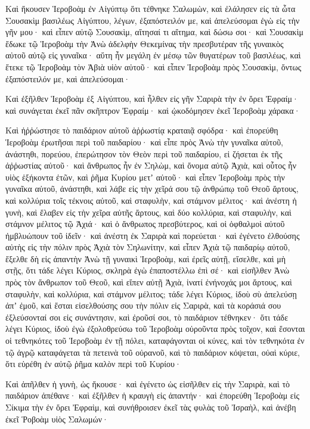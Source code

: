 {\par }{\PP {}Καὶ ἤκουσεν Ἱεροβοὰμ ἐν Αἰγύπτῳ ὅτι τέθνηκε Σαλωμὼν, καὶ ἐλάλησεν εἰς τὰ ὦτα Σουσακὶμ βασιλέως Αἰγύπτου, λέγων, ἐξαπόστειλόν με, καὶ ἀπελεύσομαι ἐγὼ εἰς τὴν γῆν μου· καὶ εἶπεν αὐτῷ Σουσακὶμ, αἴτησαί τι αἴτημα, καὶ δώσω σοι·
καὶ Σουσακὶμ ἔδωκε τῷ Ἱεροβοὰμ τὴν Ἀνὼ ἀδελφὴν Θεκεμίνας τὴν πρεσβυτέραν τῆς γυναικὸς αὐτοῦ αὐτῷ εἰς γυναῖκα· αὕτη ἦν μεγάλη ἐν μέσῳ τῶν θυγατέρων τοῦ βασιλέως, καὶ ἔτεκε τῷ Ἱεροβοὰμ τὸν Ἀβιὰ υἱὸν αὐτοῦ·
καὶ εἶπεν Ἱεροβοὰμ πρὸς Σουσακὶμ, ὄντως ἐξαπόστειλόν με, καὶ ἀπελεύσομαι·
\par }{\PP Καὶ ἐξῆλθεν Ἱεροβοὰμ ἐξ Αἰγύπτου, καὶ ἦλθεν εἰς γῆν Σαριρὰ τὴν ἐν ὄρει Ἐφραίμ· καὶ συνάγεται ἐκεῖ πᾶν σκῆπτρον Ἐφραίμ· καὶ ᾠκοδόμησεν ἐκεῖ Ἱεροβοὰμ χάρακα·
\par }{\PP {}Καὶ ἠῤῥώστησε τὸ παιδάριον αὐτοῦ ἀῤῥωστίᾳ κραταιᾷ σφόδρα· καὶ ἐπορεύθη Ἱεροβοὰμ ἐρωτῆσαι περὶ τοῦ παιδαρίου· καὶ εἶπε πρὸς Ἀνὼ τὴν γυναῖκα αὐτοῦ, ἀνάστηθι, πορεύου, ἐπερώτησον τὸν Θεὸν περὶ τοῦ παιδαρίου, εἰ ζήσεται ἐκ τῆς ἀῤῥωστίας αὐτοῦ·
καὶ ἄνθρωπος ἦν ἐν Σηλὼμ, καὶ ὄνομα αὐτῷ Ἀχιὰ, καὶ οὗτος ἦν υἱὸς ἑξήκοντα ἐτῶν, καὶ ῥῆμα Κυρίου μετʼ αὐτοῦ· καὶ εἶπεν Ἱεροβοὰμ πρὸς τὴν γυναῖκα αὐτοῦ, ἀνάστηθι, καὶ λάβε εἰς τὴν χεῖρά σου τῷ ἀνθρώπῳ τοῦ Θεοῦ ἄρτους, καὶ κολλύρια τοῖς τέκνοις αὐτοῦ, καὶ σταφυλὴν, καὶ στάμνον μέλιτος·
καὶ ἀνέστη ἡ γυνὴ, καὶ ἔλαβεν εἰς τὴν χεῖρα αὐτῆς ἄρτους, καὶ δύο κολλύρια, καὶ σταφυλὴν, καὶ στάμνον μέλιτος τῷ Ἀχιά· καὶ ὁ ἄνθρωπος πρεσβύτερος, καὶ οἱ ὀφθαλμοὶ αὐτοῦ ἠμβλυώπουν τοῦ ἰδεῖν·
καὶ ἀνέστη ἐκ Σαριρὰ καὶ πορεύεται· καὶ ἐγένετο ἐλθούσης αὐτὴς εἰς τὴν πόλιν πρὸς Ἀχιὰ τὸν Σηλωνίτην, καὶ εἶπεν Ἀχιὰ τῷ παιδαρίῳ αὐτοῦ, ἔξελθε δὴ εἰς ἀπαντὴν Ἀνὼ τῇ γυναικὶ Ἱεροβοὰμ, καὶ ἐρεῖς αὐτῇ, εἴσελθε, καὶ μὴ στῇς, ὅτι τάδε λέγει Κύριος, σκληρὰ ἐγὼ ἐπαποστέλλω ἐπὶ σέ·
καὶ εἰσῆλθεν Ἀνὼ πρὸς τὸν ἄνθρωπον τοῦ Θεοῦ, καὶ εἴπεν αὐτῇ Ἀχιὰ, ἱνατί ἐνήνοχάς μοι ἄρτους, καὶ σταφυλὴν, καὶ κολλύρια, καὶ στάμνον μέλιτος; τάδε λέγει Κύριος, ἰδοὺ σὺ ἀπελεύσῃ ἀπʼ ἐμοῦ, καὶ ἔσται εἰσελθούσης σου τὴν πόλιν εἰς Σαριρὰ, καὶ τὰ κοράσιά σου ἐξλεύσονταί σοι εἰς συνάντησιν, καὶ ἐροῦσί σοι, τὸ παιδάριον τέθνηκεν·
ὅτι τάδε λέγει Κύριος, ἰδοὺ ἐγὼ ἐξολοθρεύσω τοῦ Ἱεροβοὰμ οὐροῦντα πρὸς τοῖχον, καὶ ἔσονται οἱ τεθνηκότες τοῦ Ἱεροβοὰμ ἐν τῇ πόλει, καταφάγονται οἱ κύνες, καὶ τὸν τεθνηκότα ἐν τῷ ἀγρῷ καταφάγεται τὰ πετεινὰ τοῦ οὐρανοῦ, καὶ τὸ παιδάριον κόψεται, οὐαὶ κύριε, ὅτι εὑρέθη ἐν αὐτῷ ῥῆμα καλὸν περὶ τοῦ Κυρίου·
\par }{\PP {}Καὶ ἀπῆλθεν ἡ γυνὴ, ὡς ἤκουσε· καὶ ἐγένετο ὡς εἰσῆλθεν εἰς τὴν Σαριρὰ, καὶ τὸ παιδάριον ἀπέθανε· καὶ ἐξῆλθεν ἡ κραυγὴ εἰς ἀπαντήν· καὶ ἐπορεύθη Ἱεροβοὰμ εἰς Σίκιμα τὴν ἐν ὄρει Ἐφραὶμ, καὶ συνήθροισεν ἐκεῖ τὰς φυλὰς τοῦ Ἰσραὴλ, καὶ ἀνέβη ἐκεῖ Ῥοβοὰμ υἱὸς Σαλωμών·
}
